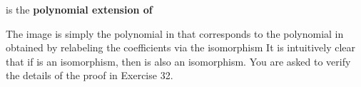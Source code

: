\documentclass[11pt,oneside]{article}
\begin{document}
\begin{BookBody}
\noindent is the\textbf{ polynomial extension of}  \BookEnd{\blacksquare}

The image  is simply the polynomial in  that corresponds to the polynomial  in  obtained by relabeling the coefficients via the isomorphism  It is intuitively clear that if  is an isomorphism, then  is also an isomorphism. You are asked to verify the details of the proof in Exercise 32.

\end{BookBody}

\BookNarrativetrue
\end{document}
